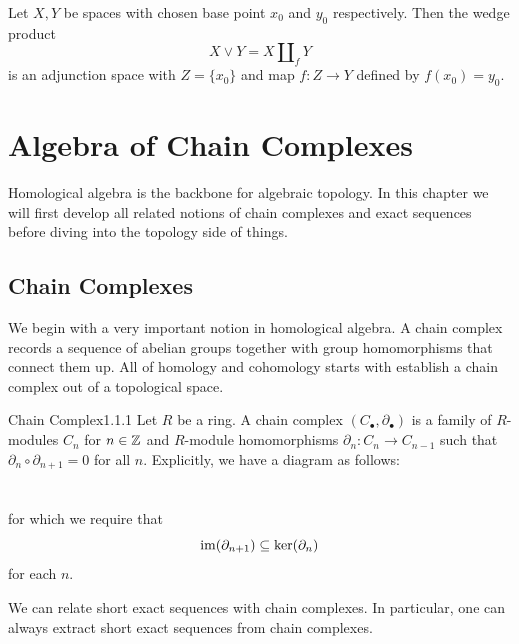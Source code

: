 \documentclass[a4paper]{article}
\begin{document}
\begin{prp}{}{} Let $X,Y$ be spaces with chosen base point $x_0$ and $y_0$ respectively. Then the wedge product $$X\vee Y=X\amalg_fY$$ is an adjunction space with $Z=\{x_0\}$ and map $f:Z\to Y$ defined by $f(x_0)=y_0$. 
\end{prp}

\pagebreak

\section{Algebra of Chain Complexes}
Homological algebra is the backbone for algebraic topology. In this chapter we will first develop all related notions of chain complexes and exact sequences before diving into the topology side of things. 

\subsection{Chain Complexes}
We begin with a very important notion in homological algebra. A chain complex records a sequence of abelian groups together with group homomorphisms that connect them up. All of homology and cohomology starts with establish a chain complex out of a topological space. 

\begin{defn}{Chain Complex}{1.1.1} Let $R$ be a ring. A chain complex $(C_\bullet,\partial_\bullet)$ is a family of $R$-modules $C_n$ for $n\in\mathbb{Z}$ and $R$-module homomorphisms $\partial_n:C_n\to C_{n-1}$ such that $\partial_n\circ\partial_{n+1}=0$ for all $n$. Explicitly, we have a diagram as follows: \\
\\~\\
for which we require that $$\operatorname{im}(\partial_{n+1})\subseteq\ker(\partial_n)$$ for each $n$. 
\end{defn}

We can relate short exact sequences with chain complexes. In particular, one can always extract short exact sequences from chain complexes. 
\end{document}
